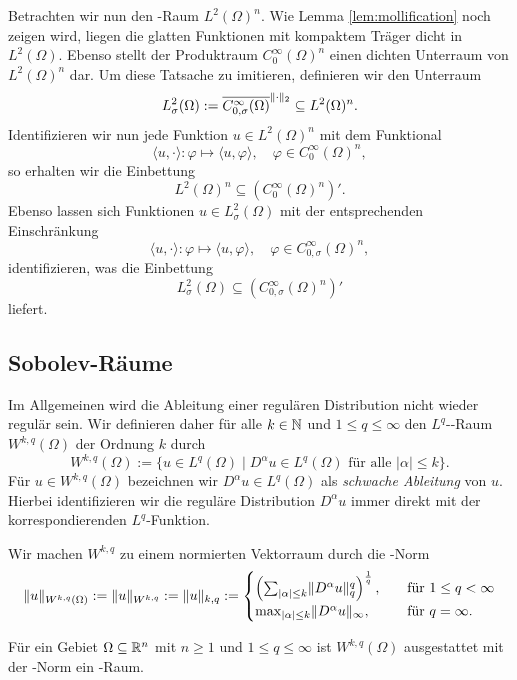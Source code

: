 Betrachten wir nun den \hilbert\hyp{}Raum $L^2(\Omega)^n$.
Wie Lemma \ref{lem:mollification} noch zeigen wird, liegen die glatten Funktionen mit kompaktem Träger dicht in $L^2(\Omega)$. 
Ebenso stellt der Produktraum $C_0^\infty(\Omega)^n$ einen dichten Unterraum von $L^2(\Omega)^n$ dar.
Um diese Tatsache zu imitieren, definieren wir den Unterraum 
$$
  L^2_\sigma(\Omega) 
  := \overline{C_{0,\sigma}^\infty(\Omega)}^{\lVert \cdot \rVert_2}
  \subseteq L^2(\Omega)^n.
$$
Identifizieren wir nun jede Funktion $u \in L^2(\Omega)^n$ mit dem Funktional
$$
\langle u, \cdot \rangle \colon \varphi \mapsto \langle u, \varphi \rangle, \quad \varphi \in C_0^\infty(\Omega)^n,
$$
so erhalten wir die Einbettung 
$$
  L^2(\Omega)^n \subseteq (C_0^\infty(\Omega)^n)'.
$$
Ebenso lassen sich Funktionen $u \in L^2_\sigma(\Omega)$ mit der entsprechenden Einschränkung
$$
\langle u, \cdot \rangle \colon \varphi \mapsto \langle u, \varphi \rangle, \quad \varphi \in C_{0,\sigma}^\infty(\Omega)^n,
$$
identifizieren, was die Einbettung
$$
  L^2_\sigma(\Omega) \subseteq (C_{0,\sigma}^\infty(\Omega)^n)'
$$
liefert.

\subsection{Sobolev-Räume}

Im Allgemeinen wird die Ableitung einer regulären Distribution nicht wieder regulär sein.
Wir definieren daher für alle $k \in \mathbb{N}$ und $1 \leq q \leq \infty$ den $L^q$\hyp{}\sobolev\hyp{}Raum $W^{k,q}(\Omega)$ der Ordnung $k$ durch
$$
W^{k,q}(\Omega) := \{ u \in L^q(\Omega) \mid D^\alpha u \in L^q(\Omega) \text{ für alle } |\alpha| \leq k\}.
$$
Für $u \in W^{k,q}(\Omega)$ bezeichnen wir $D^\alpha u \in L^q(\Omega)$ als \emph{schwache Ableitung} von $u$.
Hierbei identifizieren wir die reguläre Distribution $D^\alpha u$ immer direkt mit der korrespondierenden $L^q$\hyp{}Funktion.

Wir machen $W^{k,q}$ zu einem normierten Vektorraum durch die \sobolev\hyp{}Norm
$$
  \lVert u \rVert_{W^{k,q}(\Omega)} 
  := \lVert u \rVert_{W^{k,q}} 
  := \lVert u \rVert_{k,q} 
  := \begin{cases} 
    \left(\sum_{|\alpha| \leq k} \lVert D^\alpha u \rVert_q^q \right)^\frac{1}{q},\quad&\text{für } 1 \leq q < \infty \\
    \max_{|\alpha| \leq k} \lVert D^\alpha u \rVert_\infty, \quad&\text{für }q = \infty.
    \end{cases}
$$

\begin{lem}
  Für ein Gebiet $\Omega \subseteq \mathbb{R}^n$ mit $n \geq 1$ und $1 \leq q \leq \infty$ ist $W^{k,q}(\Omega)$ ausgestattet mit der \sobolev\hyp{}Norm ein \banach\hyp{}Raum.
\end{lem}

